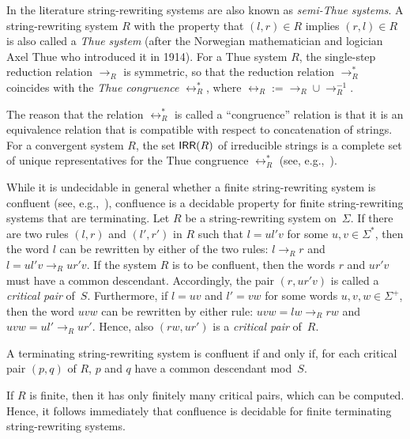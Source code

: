 In the literature string-rewriting systems are also known as \emph{semi-Thue systems}. A string-rewriting system $R$ with the property that $(l, r) \in R$ implies $(r, l) \in R$ is also called a \emph{Thue system} (after the Norwegian mathematician and logician Axel Thue who introduced it in 1914). For a Thue system $R$, the single-step reduction relation $\to_R$ is symmetric, so that the reduction relation $\to^*_R$ coincides with the \emph{Thue congruence} $\leftrightarrow^*_R$, where $\leftrightarrow_R := \rightarrow_R \cup \rightarrow_R^{-1}$.

The reason that the relation $\leftrightarrow^*_R$ is called a ``congruence'' relation is that it is an equivalence relation that is compatible with respect to concatenation of strings. For a convergent system $R$, the set $\textup{\sf IRR}(R)$ of irreducible strings is a complete set of unique representatives for the Thue congruence $\leftrightarrow^*_R$ (see, e.g.,~\cite{bookOtto93}).

While it is undecidable in general whether a finite string-rewriting system is confluent (see, e.g.,~\cite{bookOtto93}), confluence is a decidable property for finite string-rewriting systems that are terminating. Let $R$ be a string-rewriting system on~$\Sigma$. If there are two rules $(l, r)$ and $(l', r')$ in $R$ such that $l = ul'v$ for some $u,v\in\Sigma^*$, then the word $l$ can be rewritten by either of the two rules: $l \rightarrow_R r$ and $l =ul'v\rightarrow_R ur'v$. If the system $R$ is to be confluent, then the words $r$ and $ur'v$ must have a common descendant. Accordingly, the pair $(r,ur'v)$ is called a \emph{critical pair} of~$S$. Furthermore, if $l = uv$ and $l'=vw$ for some words $u,v,w\in\Sigma^+$, then the word $uvw$ can be rewritten by either rule: $uvw= l w\rightarrow_R rw$ and $uvw =ul'\rightarrow_R ur'$. Hence, also $(rw,ur')$ is  a \emph{critical pair} of~$R$.

\begin{proposition}\label{PropCon}{\rm \cite{KnBe70}}
A terminating string-rewriting system is confluent if and only if, for each critical pair $(p,q)$ of $R$, $p$ and $q$ have a common descendant mod~$S$. 
\end{proposition}

If $R$ is finite, then it has only finitely many critical pairs, which can be computed. Hence, it follows immediately that confluence is decidable for finite terminating string-rewriting systems.

